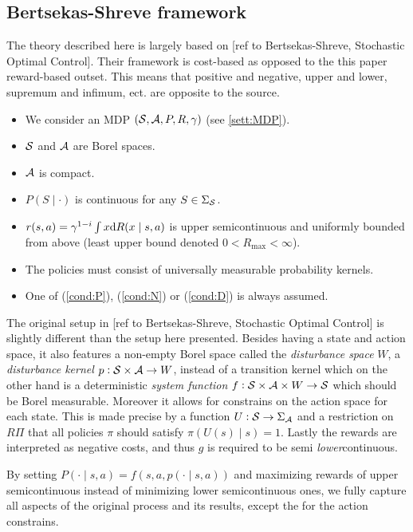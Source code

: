 \subsection{Bertsekas-Shreve framework}
The theory described here is largely based on
[ref to Bertsekas-Shreve, Stochastic Optimal Control].
Their framework is cost-based as opposed to the this paper reward-based outset.
This means that positive and negative, upper and lower, supremum and infimum,
ect. are opposite to the source.
\begin{sett}[BS]
  \begin{itemize}
    \item We consider an MDP $(\mathcal{S}, \mathcal{A}, P, R, \gamma)$
      (see \cref{sett:MDP}).
    \item $\mathcal{S}$ and $\mathcal{A}$ are Borel spaces.
    \item $\mathcal{A}$ is compact.
    \item $P(S \mid \cdot)$ is continuous for any $S \in \Sigma_{\mathcal{S}}$.
    \item $r(s,a) = \gamma^{1-i} \int x \mathrm{d} R(x \mid s, a)$ 
      is upper semicontinuous and uniformly bounded from above
      (least upper bound denoted $0 < R_{\max} < \infty$).
    \item The policies must consist of
      universally measurable probability kernels.
    \item One of (\cref{cond:P}), (\cref{cond:N}) or (\cref{cond:D})
      is always assumed.
  \end{itemize}
  \label{sett:BS}
\end{sett}
The original setup in [ref to Bertsekas-Shreve, Stochastic Optimal Control]
is slightly different than the setup here presented.
Besides having a state and action space, it also features a 
non-empty Borel space called the
\emph{disturbance space} $W$, a \emph{disturbance kernel}
$p: \mathcal{S} \times \mathcal{A} \to W$,
instead of a transition kernel which on the other hand is a deterministic
\emph{system function} $f : \mathcal{S} \times \mathcal{A} \times W \to \mathcal{S}$
which should be Borel measurable.
Moreover it allows for constrains on the action space for each state.
This is made precise by a function $U:\mathcal{S} \to \Sigma_{\mathcal{A}}$
and a restriction on $R\Pi$ that all policies $\pi$ should satisfy
$\pi(U(s) \mid s) = 1$.
Lastly the rewards are interpreted as negative costs, and thus
$g$ is required to be semi \emph{lower}continuous.

By setting $P(\cdot \mid s, a) = f(s, a, p(\cdot \mid s, a))$
and maximizing rewards of upper semicontinuous instead of
minimizing lower semicontinuous ones, we fully capture
all aspects of the original process and its results,
except the for the action constrains. %

